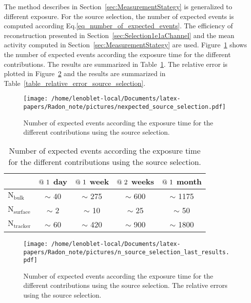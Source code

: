 \documentclass[main.tex]{subfiles}
\begin{document}
\noindent The method describes in Section~\ref{sec:MeasurementStategy} is generalized to different exposure. For the source selection, the number of expected events is computed according Eq.\ref{eq_number_of_expected_events}. The efficiency of reconstruction presented in Section~\ref{sec:Selection1e1aChannel} and the mean activity computed in Section~\ref{sec:MeasurementStategy} are used. Figure~\ref{picture_number_of_expected_events_source_selection} shows the number of expected events according the exposure time for the different contributions. The results are summarized in Table~\ref{table_number_of_expected_events_source_selection}. The relative error is plotted in Figure~\ref{picture_relative_error_source_selection} and the results are summarized in Table~\ref{table_relative_error_source_selection}.


\begin{figure}[h!]
\begin{center}
\texttt{[image: /home/lenoblet-local/Documents/latex-papers/Radon\_note/pictures/nexpected\_source\_selection.pdf]}
\caption{Number of expected events according the exposure time for the different contributions using the source selection.}
\label{picture_number_of_expected_events_source_selection}
\end{center}
\end{figure}


\begin{table}[h!]
\begin{center}
\begin{tabular}{l|c|c|c|c}
 & $\symbol{64}~1$ day  & $\symbol{64}~1$ week  & $\symbol{64}~2$ weeks & $\symbol{64}~1$ month  \\
\hline
$\text{N}_\text{bulk}$    & $\sim$ 40 & $\sim$ 275  & $\sim$ 600 & $\sim$ 1175 \\
$\text{N}_\text{surface}$ & $\sim$ 2  & $\sim$ 10   & $\sim$ 25  & $\sim$ 50   \\
$\text{N}_\text{tracker}$ & $\sim$ 60 & $\sim$ 420  & $\sim$ 900 & $\sim$ 1800 \\
\hline
\end{tabular}
\end{center}
\caption{Number of expected events according the exposure time for the different contributions using the source selection.}
\label{table_number_of_expected_events_source_selection}
\end{table}


\begin{figure}[h!]
\begin{center}
\texttt{[image: /home/lenoblet-local/Documents/latex-papers/Radon\_note/pictures/n\_source\_selection\_last\_results.pdf]}
\caption{Number of expected events according the exposure time for the different contributions using the source selection. The relative errors using the source selection.}
\label{picture_relative_error_source_selection}
\end{center}
\end{figure}
\end{document}
